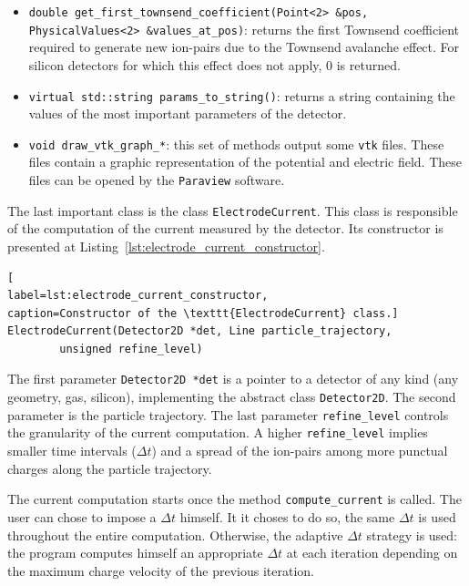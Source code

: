 \documentclass[11pt]{article}
\begin{document}
\begin{itemize}
			\item \lstinline{double get_first_townsend_coefficient(Point<2> &pos, PhysicalValues<2> &values_at_pos)}:
			returns the first Townsend coefficient required to generate new ion-pairs due
			to the Townsend avalanche effect. For silicon detectors for which this effect
			does not apply, 0 is returned.

			\item \lstinline{virtual std::string params_to_string()}: returns a string
			containing the values of the most important parameters of the detector.

			\item \lstinline{void draw_vtk_graph_*}: this set of methods output some \texttt{vtk}
			files. These files contain a graphic representation of the potential and
			electric field. These files can be opened by the \texttt{Paraview} software.
		\end{itemize}

		The last important class is the class \texttt{ElectrodeCurrent}. This class
		is responsible of the computation of the current measured by the detector. Its
		constructor is presented at Listing~\ref{lst:electrode_current_constructor}.
		\newline

		\begin{lstlisting}[
label=lst:electrode_current_constructor,
caption=Constructor of the \texttt{ElectrodeCurrent} class.]
ElectrodeCurrent(Detector2D *det, Line particle_trajectory,
		unsigned refine_level)
		\end{lstlisting}

		The first parameter \texttt{Detector2D *det} is a pointer to a detector of
		any kind (any geometry, gas, silicon), implementing the abstract class \texttt{Detector2D}.
		The second parameter is the particle trajectory. The last parameter \texttt{refine\_level}
		controls the granularity of the current computation. A higher \texttt{refine\_level}
		implies smaller time intervals ($\Delta t$) and a spread of the ion-pairs among
		more punctual charges along the particle trajectory.

		The current computation starts once the method \texttt{compute\_current} is called.
		The user can chose to impose a $\Delta t$ himself. It it choses to do so, the
		same $\Delta t$ is used throughout the entire computation. Otherwise,
		the adaptive $\Delta t$ strategy is used: the program computes himself an
		appropriate $\Delta t$ at each iteration depending on the maximum charge velocity
		of the previous iteration.
\end{document}
